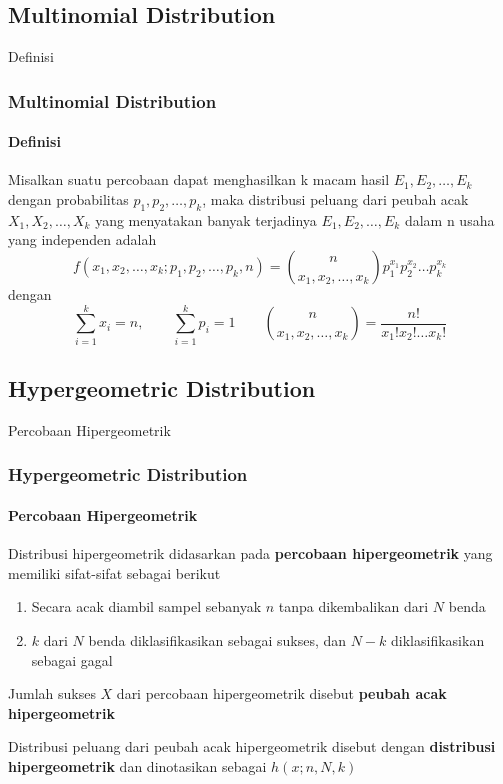 \documentclass[]{beamer}
\begin{document}
\subsection{Multinomial Distribution}    

\begin{frame}{Definisi}
    \frametitle{Multinomial Distribution}
    \framesubtitle{Definisi}
    Misalkan suatu percobaan dapat menghasilkan k macam hasil $E_1, E_2,\dots,E_k$ dengan probabilitas $p_1, p_2, \dots, p_k$, maka distribusi peluang dari peubah acak $X_1, X_2,\dots,X_k$ yang menyatakan banyak terjadinya $E_1, E_2,\dots,E_k$ dalam n usaha yang independen adalah
    \bigskip
    \begin{equation*}
    f(x_1,x_2,\dots,x_k;p_1,p_2,\dots,p_k,n) = \binom{n}{x_1,x_2,\dots,x_k}p_1^{x_1}p_2^{x_2}\dots p_k^{x_k}
    \end{equation*}
    \bigskip
    dengan
    \bigskip
    \begin{equation*}
        \sum_{i=1}^kx_i = n, \qquad \sum_{i=1}^kp_i = 1 \qquad \binom{n}{x_1,x_2, \dots, x_k}=\frac{n!}{x_1!x_2!\dots x_k!}
    \end{equation*}
\end{frame}

\subsection{Hypergeometric Distribution}

\begin{frame}{Percobaan Hipergeometrik}
    \frametitle{Hypergeometric Distribution}
    \framesubtitle{Percobaan Hipergeometrik}
    Distribusi hipergeometrik didasarkan pada \textbf{percobaan hipergeometrik} yang memiliki sifat-sifat sebagai berikut 
    \begin{enumerate}
        \item Secara acak diambil sampel sebanyak $n$ tanpa dikembalikan dari $N$ benda
        \item $k$ dari $N$ benda diklasifikasikan sebagai sukses, dan $N-k$ diklasifikasikan sebagai gagal
    \end{enumerate}
    Jumlah sukses $X$ dari percobaan hipergeometrik disebut \textbf{peubah acak hipergeometrik}
    
    \bigskip
    
    Distribusi peluang dari peubah acak hipergeometrik disebut dengan \textbf{distribusi hipergeometrik} dan dinotasikan sebagai $h(x;n,N,k)$
\end{frame}
\end{document}
